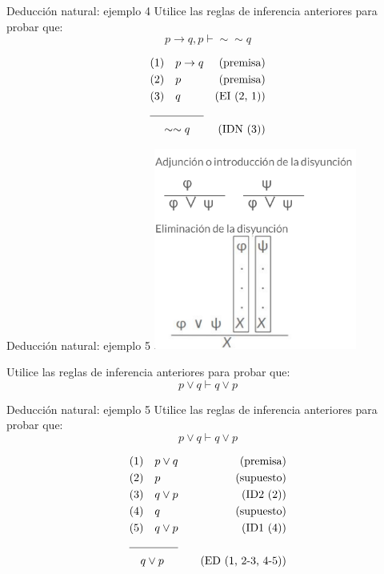 \documentclass{beamer}
\begin{document}
\begin{frame}{Deducción natural: ejemplo 4}
  Utilice las reglas de inferencia anteriores para probar que:
  $$p \rightarrow q, p \vdash \sim \sim q$$

  \begin{align*}
    &(1) \quad p \rightarrow q &\text{(premisa)}\\
    &(2) \quad p &\text{(premisa)}\\
    &(3) \quad q &\text{(EI (2, 1))}\\
    \cline{1-2}
    &\quad \sim \sim q &\text{(IDN (3))}
  \end{align*}
\end{frame}


\begin{frame}{Deducción natural: ejemplo 5}
  \centering
  \includegraphics[width=0.5\textwidth]{images/reglas_inferencia.png}

  Utilice las reglas de inferencia anteriores para probar que:
  $$p \vee q \vdash q \vee p$$
\end{frame}


\begin{frame}{Deducción natural: ejemplo 5}
  Utilice las reglas de inferencia anteriores para probar que:
  $$p \vee q \vdash q \vee p$$

  \begin{align*}
    &(1) \quad p \vee q  & \quad (\text{premisa}) \\
    &(2) \quad p  & \quad (\text{supuesto}) \\
    &(3) \quad q \vee p  & \quad (\text{ID2 (2)}) \\
    &(4) \quad q  & \quad (\text{supuesto}) \\
    &(5) \quad q \vee p  & \quad (\text{ID1 (4)}) \\
    \cline{1-2}
    & \quad q \vee p & \quad (\text{ED (1, 2-3, 4-5)})
  \end{align*}

\end{frame}
\end{document}
